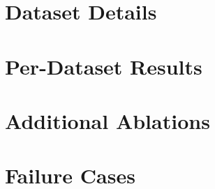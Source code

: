 \documentclass{article}
\begin{document}
\section{Dataset Details}

\section{Per-Dataset Results}

\section{Additional Ablations}

\section{Failure Cases}


\newpage

\end{document}
